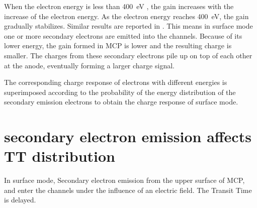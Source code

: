 \documentclass{article}
\begin{document}
When the electron energy is less than \SI{400}{eV} , the gain increases with the increase of the electron energy.
As the electron energy reaches \SI{400}{eV}, the gain gradually stabilizes.
Similar results are reported in \cite{2017MCP}.
This means in surface mode one or more secondary electrons are emitted into the channels.
Because of its lower energy, the gain formed in MCP is lower and the resulting charge is smaller.
The charges from these secondary electrons pile up on top of each other at the anode, eventually forming a larger charge signal.

The corresponding charge response of electrons with different energies is superimposed
according to the probability of the energy distribution of the secondary emission electrons
to obtain the charge response of surface mode.
\section{secondary electron emission affects TT distribution}\label{sec:TT}
In surface mode, Secondary electron emission from the upper surface of MCP,
and enter the channels under the influence of an electric field.
The Transit Time is delayed.

\newpage


\end{document}
